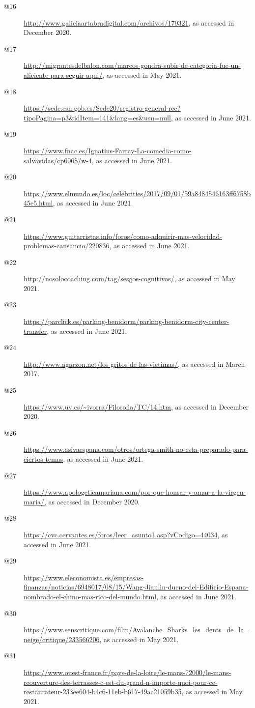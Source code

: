 \begin{flushleft}
\begin{description}
\item[@16] \url{http://www.galiciaartabradigital.com/archivos/179321}, as accessed in December 2020.
\item[@17] \url{http://migrantesdelbalon.com/marcos-gondra-subir-de-categoria-fue-un-aliciente-para-seguir-aqui/}, as accessed in May 2021.
\item[@18] \url{https://sede.csn.gob.es/Sede20/registro-general-rec?tipoPagina=p3&idItem=141&lang=es&usu=null}, as accessed in June 2021.
\item[@19] \url{https://www.fnac.es/Ignatius-Farray-La-comedia-como-salvavidas/cp6068/w-4}, as accessed in June 2021.
\item[@20] \url{https://www.elmundo.es/loc/celebrities/2017/09/01/59a8484546163ff6758b45e5.html}, as accessed in June 2021.
\item[@21] \url{https://www.guitarristas.info/foros/como-adquirir-mas-velocidad-problemas-cansancio/220836}, as accessed in June 2021.
\item[@22] \url{http://nosolocoaching.com/tag/sesgos-cognitivos/}, as accessed in May 2021.
\item[@23] \url{https://parclick.es/parking-benidorm/parking-benidorm-city-center-transfer}, as accessed in June 2021.
\item[@24] \url{http://www.agarzon.net/los-gritos-de-las-victimas/}{, as accessed in March 2017.}
\item[@25] \url{https://www.uv.es/~ivorra/Filosofia/TC/14.htm}, as accessed in December 2020.
\item[@26] \url{https://www.asivaespana.com/otros/ortega-smith-no-esta-preparado-para-ciertos-temas}, as accessed in June 2021.
\item[@27] \href{https://www.apologeticamariana.com/por-que-honrar-y-amar-a-la-virgen-maria/,\%^20}{{https://www.apologeticamariana.com/por-que-honrar-y-amar-a-la-virgen-maria/,}} as accessed in December 2020.
\item[@28] \url{https://cvc.cervantes.es/foros/leer_asunto1.asp?vCodigo=44034}, as accessed in June 2021.
\item[@29] \url{https://www.eleconomista.es/empresas-finanzas/noticias/6948017/08/15/Wang-Jianlin-dueno-del-Edificio-Espana-nombrado-el-chino-mas-rico-del-mundo.html}, as accessed in June 2021.
\item[@30] \url{https://www.senscritique.com/film/Avalanche_Sharks_les_dents_de_la_neige/critique/233566206}, as accessed in May 2021.
\item[@31] \url{https://www.ouest-france.fr/pays-de-la-loire/le-mans-72000/le-mans-reouverture-des-terrasses-c-est-du-grand-n-importe-quoi-pour-ce-restaurateur-233ee604-b4c6-11eb-b617-49ac21059b35}, as accessed in May 2021.

\end{description}
\end{flushleft}
